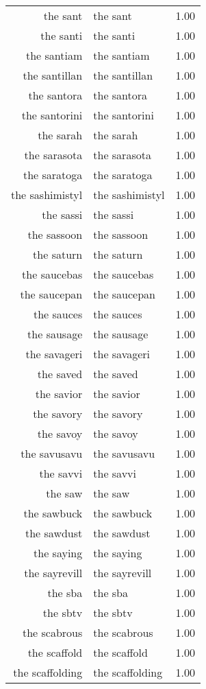 \begin{table}[ht]
\begin{tabular}{rlr}
  the sant & the sant & 1.00 \\ 
  the santi & the santi & 1.00 \\ 
  the santiam & the santiam & 1.00 \\ 
  the santillan & the santillan & 1.00 \\ 
  the santora & the santora & 1.00 \\ 
  the santorini & the santorini & 1.00 \\ 
  the sarah & the sarah & 1.00 \\ 
  the sarasota & the sarasota & 1.00 \\ 
  the saratoga & the saratoga & 1.00 \\ 
  the sashimistyl & the sashimistyl & 1.00 \\ 
  the sassi & the sassi & 1.00 \\ 
  the sassoon & the sassoon & 1.00 \\ 
  the saturn & the saturn & 1.00 \\ 
  the saucebas & the saucebas & 1.00 \\ 
  the saucepan & the saucepan & 1.00 \\ 
  the sauces & the sauces & 1.00 \\ 
  the sausage & the sausage & 1.00 \\ 
  the savageri & the savageri & 1.00 \\ 
  the saved & the saved & 1.00 \\ 
  the savior & the savior & 1.00 \\ 
  the savory & the savory & 1.00 \\ 
  the savoy & the savoy & 1.00 \\ 
  the savusavu & the savusavu & 1.00 \\ 
  the savvi & the savvi & 1.00 \\ 
  the saw & the saw & 1.00 \\ 
  the sawbuck & the sawbuck & 1.00 \\ 
  the sawdust & the sawdust & 1.00 \\ 
  the saying & the saying & 1.00 \\ 
  the sayrevill & the sayrevill & 1.00 \\ 
  the sba & the sba & 1.00 \\ 
  the sbtv & the sbtv & 1.00 \\ 
  the scabrous & the scabrous & 1.00 \\ 
  the scaffold & the scaffold & 1.00 \\ 
  the scaffolding & the scaffolding & 1.00 \\ 

\end{tabular}
\end{table}
